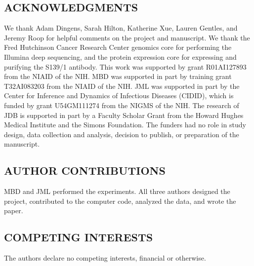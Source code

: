 \documentclass[11pt]{article}
\begin{document}
\subsection*{ACKNOWLEDGMENTS}
We thank Adam Dingens, Sarah Hilton, Katherine Xue, Lauren Gentles, and Jeremy Roop for helpful comments on the project and manuscript.
We thank the Fred Hutchinson Cancer Research Center genomics core for performing the Illumina deep sequencing, and the protein expression core for expressing and purifying the S139/1 antibody.
This work was supported by grant R01AI127893 from the NIAID of the NIH.
MBD was supported in part by training grant T32AI083203 from the NIAID of the NIH.
JML was supported in part by the Center for Inference and Dynamics of Infectious Diseases (CIDID), which is funded by grant U54GM111274 from the NIGMS of the NIH.
The research of JDB is supported in part by a Faculty Scholar Grant from the Howard Hughes Medical Institute and the Simons Foundation.
The funders had no role in study design, data collection and analysis, decision to publish, or preparation of the manuscript.

\subsection*{AUTHOR CONTRIBUTIONS}
MBD and JML performed the experiments.
All three authors designed the project, contributed to the computer code, analyzed the data, and wrote the paper.

\subsection*{COMPETING INTERESTS}
The authors declare no competing interests, financial or otherwise.
\end{document}
